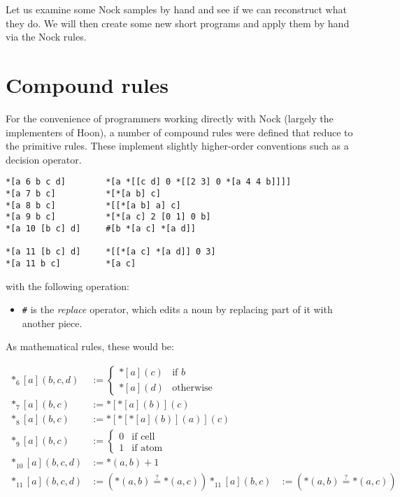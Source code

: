 Let us examine some Nock samples by hand and see if we can reconstruct what they do.  We will then create some new short programs and apply them by hand via the Nock rules.


\section{Compound rules}

For the convenience of programmers working directly with Nock (largely the implementers of Hoon), a number of compound rules were defined that reduce to the primitive rules.  These implement slightly higher-order conventions such as a decision operator.

\begin{lstlisting}[style=nonumbers]
*[a 6 b c d]        *[a *[[c d] 0 *[[2 3] 0 *[a 4 4 b]]]]
*[a 7 b c]          *[*[a b] c]
*[a 8 b c]          *[[*[a b] a] c]
*[a 9 b c]          *[*[a c] 2 [0 1] 0 b]
*[a 10 [b c] d]     #[b *[a c] *[a d]]

*[a 11 [b c] d]     *[[*[a c] *[a d]] 0 3]
*[a 11 b c]         *[a c]
\end{lstlisting}

with the following operation:

\begin{itemize}
  \item  \texttt{\#} is the \emph{replace} operator, which edits a noun by replacing part of it with another piece.
\end{itemize}

As mathematical rules, these would be:

\begin{align}
*_{6}[a](b,c,d) &:= \left\{ \begin{matrix} *[a](c) & \textrm{if } b \\ *[a](d) & \textrm{otherwise} \end{matrix} \right. \\
*_{7}[a](b,c) &:= *[*[a](b)](c) \\
*_{8}[a](b,c) &:= *[*[*[a](b)](a)](c) \\  %
*_{9}[a](b,c) &:= \left\{\begin{matrix} 0 & \text{if cell} \\ 1 & \text{if atom} \end{matrix} \right. \\
*_{10}[a](b,c,d) &:= {*(a,b) + 1} \\
*_{11}[a](b,c,d) &:= ({*(a,b)} \stackrel{?}{=} {*(a,c)})
*_{11}[a](b,c) &:= ({*(a,b)} \stackrel{?}{=} {*(a,c)})
\end{align}

